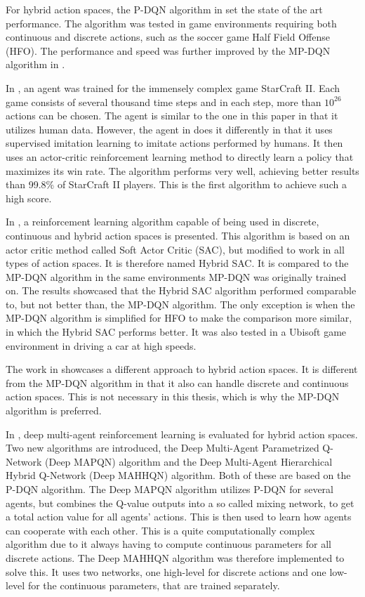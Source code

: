 \documentclass{kththesis}
\begin{document}
For hybrid action spaces, the P-DQN algorithm in \parencite{xiong2018parametrized} set the state of the art performance. The algorithm was tested in game environments requiring both continuous and discrete actions, such as the soccer game Half Field Offense (HFO). The performance and speed was further improved by the MP-DQN algorithm in \parencite{bester2019mpdqn}.

In \parencite{vinyals2019grandmaster}, an agent was trained for the immensely complex game StarCraft II. Each game consists of several thousand time steps and in each step, more than $10^{26}$ actions can be chosen. The agent is similar to the one in this paper in that it utilizes human data. However, the agent in \parencite{vinyals2019grandmaster} does it differently in that it uses supervised imitation learning to imitate actions performed by humans. It then uses an actor-critic reinforcement learning method to directly learn a policy that maximizes its win rate. The algorithm performs very well, achieving better results than 99.8\% of StarCraft II players. This is the first algorithm to achieve such a high score.

In \parencite{delalleau2019discrete}, a reinforcement learning algorithm capable of being used in discrete, continuous and hybrid action spaces is presented. This algorithm is based on an actor critic method called Soft Actor Critic (SAC), but modified to work in all types of action spaces. It is therefore named Hybrid SAC. It is compared to the MP-DQN algorithm in the same environments MP-DQN was originally trained on. The results showcased that the Hybrid SAC algorithm performed comparable to, but not better than, the MP-DQN algorithm. The only exception is when the MP-DQN algorithm is simplified for HFO to make the comparison more similar, in which the Hybrid SAC performs better. It was also tested in a Ubisoft game environment in driving a car at high speeds.

The work in \parencite{delalleau2019discrete} showcases a different approach to hybrid action spaces. It is different from the MP-DQN algorithm in that it also can handle discrete and continuous action spaces. This is not necessary in this thesis, which is why the MP-DQN algorithm is preferred.

In \parencite{fu2019deep}, deep multi-agent reinforcement learning is evaluated for hybrid action spaces. Two new algorithms are introduced, the Deep Multi-Agent Parametrized Q-Network (Deep MAPQN) algorithm and the Deep Multi-Agent Hierarchical Hybrid Q-Network (Deep MAHHQN) algorithm. Both of these are based on the P-DQN algorithm. The Deep MAPQN algorithm utilizes P-DQN for several agents, but combines the Q-value outputs into a so called mixing network, to get a total action value for all agents' actions. This is then used to learn how agents can cooperate with each other. This is a quite computationally complex algorithm due to it always having to compute continuous parameters for all discrete actions. The Deep MAHHQN algorithm was therefore implemented to solve this. It uses two networks, one high-level for discrete actions and one low-level for the continuous parameters, that are trained separately. 
\end{document}
